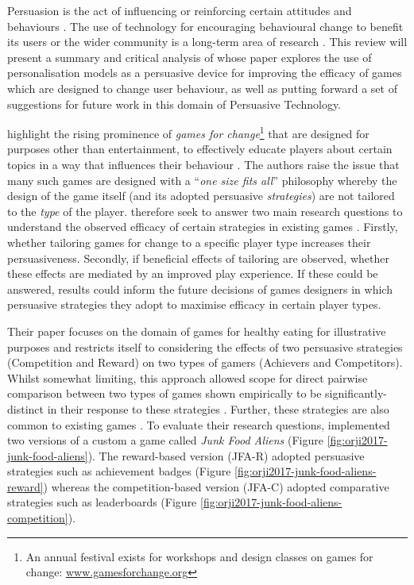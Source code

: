 \documentclass[11pt]{article}
\begin{document}
Persuasion is the act of influencing or reinforcing certain attitudes and behaviours \citep{khaled2008}. The use of technology for encouraging behavioural change to benefit its users or the wider community is a long-term area of research \citep{fogg2002}. This review will present a summary and critical analysis of \citet{orji2017} whose paper explores the use of personalisation models as a persuasive device for improving the efficacy of games which are designed to change user behaviour, as well as putting forward a set of suggestions for future work in this domain of Persuasive Technology.

\citet{orji2017} highlight the rising prominence of \textit{games for change}\footnote{An annual festival exists for workshops and design classes on games for change: \url{www.gamesforchange.org}} that are designed for purposes other than entertainment, to effectively educate players about certain topics in a way that influences their behaviour \citep{busch2015}.  The authors raise the issue that many such games are designed with a ``\textit{one size fits all}'' philosophy whereby the design of the game itself (and its adopted persuasive \textit{strategies}) are not tailored to the \textit{type} of the player. \citet{orji2017} therefore seek to answer two main research questions to understand the observed efficacy of certain strategies in existing games \citep{peng2009,kaipainen2012}. Firstly, whether tailoring games for change to a specific player type increases their persuasiveness. Secondly, if beneficial effects of tailoring are observed, whether these effects are mediated by an improved play experience. If these could be answered, results could inform the future decisions of games designers in which persuasive strategies they adopt to maximise efficacy in certain player types. 

Their paper focuses on the domain of games for healthy eating for illustrative purposes and restricts itself to considering the effects of two persuasive strategies (Competition and Reward) on two types of gamers (Achievers and Competitors). Whilst somewhat limiting, this approach allowed scope for direct pairwise comparison between two types of games shown empirically to be significantly-distinct in their response to these strategies \citep{orji2013a}. Further, these strategies are also common to existing games \citep{bell2006}. To evaluate their research questions, \citeauthor{orji2017} implemented two versions of a custom a game called \textit{Junk Food Aliens} (Figure \ref{fig:orji2017-junk-food-aliens}). The reward-based version (JFA-R) adopted persuasive strategies such as achievement badges (Figure \ref{fig:orji2017-junk-food-aliens-reward}) whereas the competition-based version (JFA-C) adopted comparative strategies such as leaderboards (Figure \ref{fig:orji2017-junk-food-aliens-competition}).
\end{document}
